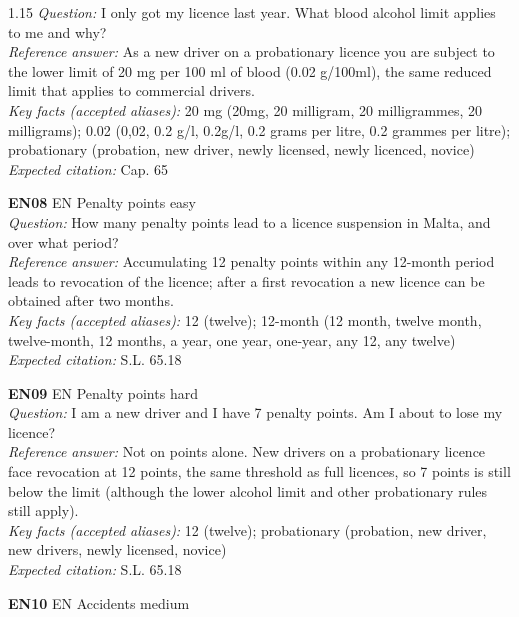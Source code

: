 \begin{spacing}{1.15}
\textit{Question:} I only got my licence last year. What blood alcohol limit applies to me and why? \\
\textit{Reference answer:} As a new driver on a probationary licence you are subject to the lower limit of 20 mg per 100 ml of blood (0.02 g/100ml), the same reduced limit that applies to commercial drivers. \\
\textit{Key facts (accepted aliases):} 20 mg (20mg, 20 milligram, 20 milligrammes, 20 milligrams); 0.02 (0,02, 0.2 g/l, 0.2g/l, 0.2 grams per litre, 0.2 grammes per litre); probationary (probation, new driver, newly licensed, newly licenced, novice) \\
\textit{Expected citation:} Cap. 65
\par\vspace{5pt}
\noindent\textbf{EN08} \quad EN \quad Penalty points \quad easy \\
\textit{Question:} How many penalty points lead to a licence suspension in Malta, and over what period? \\
\textit{Reference answer:} Accumulating 12 penalty points within any 12-month period leads to revocation of the licence; after a first revocation a new licence can be obtained after two months. \\
\textit{Key facts (accepted aliases):} 12 (twelve); 12-month (12 month, twelve month, twelve-month, 12 months, a year, one year, one-year, any 12, any twelve) \\
\textit{Expected citation:} S.L. 65.18
\par\vspace{5pt}
\noindent\textbf{EN09} \quad EN \quad Penalty points \quad hard \\
\textit{Question:} I am a new driver and I have 7 penalty points. Am I about to lose my licence? \\
\textit{Reference answer:} Not on points alone. New drivers on a probationary licence face revocation at 12 points, the same threshold as full licences, so 7 points is still below the limit (although the lower alcohol limit and other probationary rules still apply). \\
\textit{Key facts (accepted aliases):} 12 (twelve); probationary (probation, new driver, new drivers, newly licensed, novice) \\
\textit{Expected citation:} S.L. 65.18
\par\vspace{5pt}
\noindent\textbf{EN10} \quad EN \quad Accidents \quad medium \\

\end{spacing}
